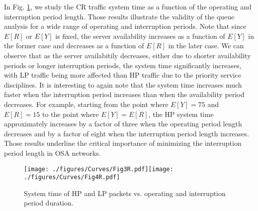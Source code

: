 \documentclass[11pt,journal,oneside,onecolumn,draftclsnofoot]{IEEEtran}
\begin{document}
In Fig. \ref{fig:34212-D1D2-EE-Alpha}, we study the CR traffic system time as a function of the operating and interruption period length. Those results illustrate the validity of the queue analysis for a wide range of operating and interruption periods.  Note that since $E[R]$ or $E[Y]$ is fixed, the server availability increases as a function of $E[Y]$ in the former case and decreases as a function of $E[R]$ in the later case. We can observe that as the server availabitily decreases, either due to shorter availability periods or longer interruption periods, the system time significantly increases, with LP traffic being more affected than HP traffic due to the priority service disciplines. It is interesting to again note that the system time increases much faster when the interruption period increases than when the availability period decreases. For example, starting from the point where $E[Y]=75$ and $E[R]=15$ to the point where $E[Y]=E[R]$, the HP system time approximately increases by a factor of three when the operating period length decreases and by a factor of eight when the interruption period length increases. Those results underline the critical importance of minimizing the interruption period length in OSA networks.
\begin{figure}\texttt{[image: ./figures/Curves/Fig3R.pdf]}\texttt{[image: ./figures/Curves/Fig4R.pdf]}\caption{System time of HP and LP packets vs.  operating and interruption period duration.}\label{fig:34212-D1D2-EE-Alpha}\end{figure}
\end{document}
